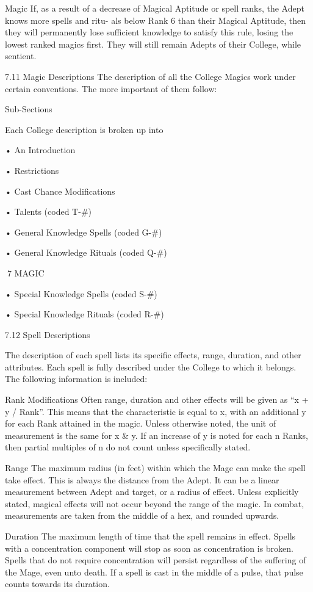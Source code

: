 \begin{Chapter}{Magic}
If, as a result of a decrease of Magical Aptitude or 
spell ranks, the Adept knows more spells and ritu-
als below Rank 6 than their Magical Aptitude, then 
they will permanently lose sufficient knowledge to 
satisfy  this  rule,  losing  the  lowest  ranked  magics 
first. They will still remain Adepts of their College, 
while sentient. 

7.11 Magic Descriptions 
The  description  of  all  the  College  Magics  work 
under  certain  conventions.  The  more  important  of 
them follow: 

Sub-Sections 

Each College description is broken up into  

• An Introduction  

• Restrictions  

• Cast Chance Modifications  

• Talents (coded T-\#)  

• General Knowledge Spells (coded G-\#)  

• General Knowledge Rituals (coded Q-\#)  

7 MAGIC 

• Special Knowledge Spells (coded S-\#)  

• Special Knowledge Rituals (coded R-\#) 

7.12 Spell Descriptions

The description of each spell lists its specific effects, range,
duration, and other attributes.  Each spell is fully described under
the College to which it belongs. The following information is
included:

Rank Modifications Often range, duration and other effects will be
given as “x + y / Rank”. This means that the characteristic is equal
to x, with an additional y for each Rank attained in the magic.
Unless otherwise noted, the unit of measurement is the same for x \&
y. If an increase of y is noted for each n Ranks, then partial
multiples of n do not count unless specifically stated.

Range The maximum radius (in feet) within which 
the  Mage  can  make  the  spell  take  effect.  This  is 
always  the  distance  from  the  Adept.  It  can  be  a 
linear measurement between Adept and target, or a 
radius  of  effect.  Unless  explicitly  stated,  magical 
effects  will  not  occur  beyond  the  range  of  the 
magic.  In  combat,  measurements  are  taken  from 
the middle of a hex, and rounded upwards. 

Duration  The  maximum  length  of  time  that  the 
spell remains in effect. Spells with a concentration 
component  will  stop  as  soon  as  concentration  is 
broken.  Spells  that  do  not  require  concentration 
will persist regardless of the suffering of the Mage, 
even unto death. If a spell is cast in the middle of a 
pulse, that pulse counts towards its duration. 


\end{Chapter}
